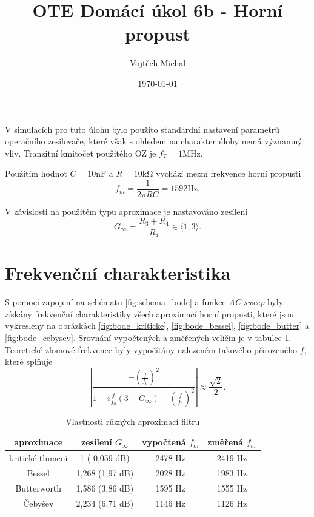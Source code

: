 \documentclass[twoside]{article}
\title{OTE Domácí úkol 6b - Horní propust}
\author{Vojtěch Michal}
\date{\today}
\begin{document}
\maketitle

V simulacích pro tuto úlohu bylo použito standardní nastavení parametrů operačního zesilovače,
které však s ohledem na charakter úlohy nemá významný vliv. Tranzitní kmitočet použitého OZ je $f_T = 1 \si{\mega\hertz}$.

Použitím hodnot $C = 10 \si{\nano\farad}$ a $R = 10 \si{\kilo\ohm}$
vychází mezní frekvence horní propusti
\begin{equation}
    f_m = \frac{1}{2 \pi R C} = 1592 \si{\hertz}.
\end{equation}

V závislosti na použitém typu aproximace je nastavováno zesílení 
\begin{equation}
    G_\infty = \frac{R_3 + R_4}{R_4} \in \langle 1; 3 \rangle.
\end{equation}

\section{Frekvenční charakteristika}

S pomocí zapojení na schématu \ref{fig:schema_bode} a funkce \textit{AC sweep} byly
získány frekvenční charakteristiky všech aproximací horní propusti,
které jsou vykresleny na obrázkách \ref{fig:bode_kriticke}, \ref{fig:bode_bessel}, \ref{fig:bode_butter} a \ref{fig:bode_cebysev}.
Srovnání vypočtených a změřených veličin je v tabulce \ref{tab:filtry}.
Teoretické zlomové frekvence byly vypočítány nalezeném takového přirozeného $f$, které splňuje
\begin{equation}
    \left| \frac{-(\frac{f}{f_0})^2}{1+i\frac{f}{f_0} (3-G_{\infty}) - (\frac{f}{f_0})^2} \right| \approx \frac{\sqrt{2}}{2}.
\end{equation}

\begin{table}
    \centering
    \begin{tabular}{c|c|c|c}
        aproximace & zesílení $G_{\infty}$ & vypočtená $f_m$ & změřená $f_m$ \\ \hline
        kritické tlumení & 1 (-0,059 dB) & 2478 \si{\hertz} & 2419 \si{\hertz} \\
        Bessel & 1,268 (1,97 dB) & 2028 \si{\hertz} & 1983 \si{\hertz} \\
        Butterworth & 1,586 (3,86 dB)  & 1595 \si{\hertz} & 1555 \si{\hertz} \\
        Čebyšev & 2,234 (6,71 dB) & 1146 \si{\hertz}& 1126 \si{\hertz}
    \end{tabular}
    \label{tab:filtry}
    \caption{Vlastnosti různých aproximací filtru}
\end{table}
\end{document}
